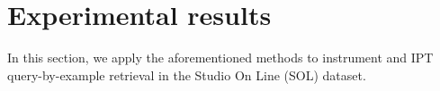 \documentclass{article}
\newcommand{\ml}[1]{\textcolor{blue}{ML : #1}}
\begin{document}
\section{Experimental results} \label{sec:exp}
In this section, we apply the aforementioned methods to instrument and IPT query-by-example retrieval in the Studio On Line (SOL) dataset.






\end{document}

